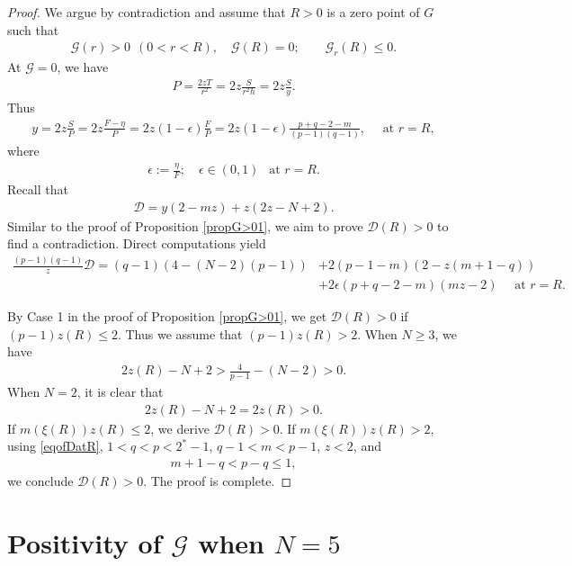 \documentclass{article}
\theoremstyle{definition} \theoremstyle{remark}
\numberwithin{equation}{section}
\newcommand{\ep}{\epsilon}
\newcommand{\G}{\mathcal{G}}
\begin{document}
	\begin{proof}
		We argue by contradiction and assume that $R > 0$ is a zero point of $G$ such that
		\begin{align*}
			\G(r) > 0 ~~ (0 < r < R), \quad \G(R) = 0; \quad \quad \G_r(R) \le 0.
		\end{align*}
		At $\G = 0$, we have
		\begin{align*}
			P = \frac{2zT}{r^2} = 2z\frac{S}{r^2h} = 2z\frac{S}{y}.
		\end{align*}
		Thus
		\begin{align*}
			y = 2z\frac{S}{P} = 2z\frac{F - \eta}{P} = 2z(1-\ep)\frac{F}{P} = 2z(1-\ep)\frac{p+q-2-m}{(p-1)(q-1)}, \quad \text{ at } r = R,
		\end{align*}
		where
		\begin{align*}
			\ep := \frac{\eta}{F}; \quad \ep \in (0,1) ~~ \text{ at } r = R.
		\end{align*}
		Recall that
		\begin{align*}
			\mathcal{D} = y(2-mz) + z(2z - N +2).
		\end{align*}
		Similar to the proof of Proposition \ref{propG>01}, we aim to prove $\mathcal{D}(R) > 0$ to find a contradiction. Direct computations yield
		\begin{align} \label{eqofDatR}
			\frac{(p-1)(q-1)}{z} \mathcal{D} = (q-1)\left(4 - (N-2)(p-1)\right) & + 2(p-1-m)\left(2 - z(m+1-q)\right) \\
			& + 2\ep(p+q-2-m)(mz - 2)\quad \text{ at } r = R.
		\end{align}
		
		By Case 1 in the proof of Proposition \ref{propG>01}, we get $\mathcal{D}(R) > 0$ if $(p-1)z(R) \le 2$. Thus we assume that $(p-1)z(R) > 2$. When $N \ge 3$, we have
		\begin{align*}
			2z(R) - N + 2 > \frac{4}{p-1} - (N-2) > 0.
		\end{align*}
		When $N =2$, it is clear that
		\begin{align*}
			2z(R) - N + 2 = 2z(R) > 0.
		\end{align*}
		If $m(\xi(R))z(R) \le 2$, we derive $\mathcal{D}(R) > 0$. If $m(\xi(R))z(R) > 2$, using \eqref{eqofDatR}, $1 <q < p < 2^* -1$, $q-1 < m < p-1$, $z < 2$, and
		\begin{align*}
			m+1 - q < p - q \le 1,
		\end{align*}
		we conclude $\mathcal{D}(R) > 0$. The proof is complete.
	\end{proof}

	\section{Positivity of $\G$ when $N = 5$} \label{G>0whenN=5}
\end{document}
